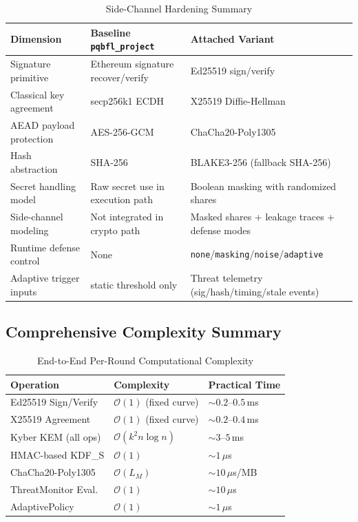 \documentclass[journal, 10pt, twocolumn]{IEEEtran}
\begin{document}
\begin{table}[H]
\centering
\caption{Side-Channel Hardening Summary}
\label{tab:sc_hardening}
\begin{tabular}{l l l}
\toprule
\textbf{Dimension} & \textbf{Baseline \texttt{pqbfl\_project}} & \textbf{Attached Variant} \\
\midrule
Signature primitive & Ethereum signature recover/verify & Ed25519 sign/verify \\
Classical key agreement & secp256k1 ECDH & X25519 Diffie-Hellman \\
AEAD payload protection & AES-256-GCM & ChaCha20-Poly1305 \\
Hash abstraction & SHA-256 & BLAKE3-256 (fallback SHA-256) \\
Secret handling model & Raw secret use in execution path & Boolean masking with randomized shares \\
Side-channel modeling & Not integrated in crypto path & Masked shares + leakage traces + defense modes \\
Runtime defense control & None & \texttt{none}/\texttt{masking}/\texttt{noise}/\texttt{adaptive} \\
Adaptive trigger inputs & static threshold only & Threat telemetry (sig/hash/timing/stale events) \\
\bottomrule
\end{tabular}
\end{table}

\subsection{Comprehensive Complexity Summary}

\begin{table}[H]
\centering
\caption{End-to-End Per-Round Computational Complexity}
\label{tab:complexity_summary}
\begin{tabular}{l l l}
\toprule
\textbf{Operation} & \textbf{Complexity} & \textbf{Practical Time} \\
\midrule
Ed25519 Sign/Verify & $\mathcal{O}(1)$ (fixed curve) & $\sim 0.2$--$0.5$\,ms \\
X25519 Agreement & $\mathcal{O}(1)$ (fixed curve) & $\sim 0.2$--$0.4$\,ms \\
Kyber KEM (all ops) & $\mathcal{O}(k^2 n \log n)$ & $\sim 3$--$5$\,ms \\
HMAC-based KDF\_S & $\mathcal{O}(1)$ & $\sim 1$\,$\mu$s \\
ChaCha20-Poly1305 & $\mathcal{O}(L_M)$ & $\sim 10$\,$\mu$s/MB \\
ThreatMonitor Eval. & $\mathcal{O}(1)$ & $\sim 10$\,$\mu$s \\
AdaptivePolicy & $\mathcal{O}(1)$ & $\sim 1$\,$\mu$s \\
\bottomrule
\end{tabular}
\end{table}
\end{document}
